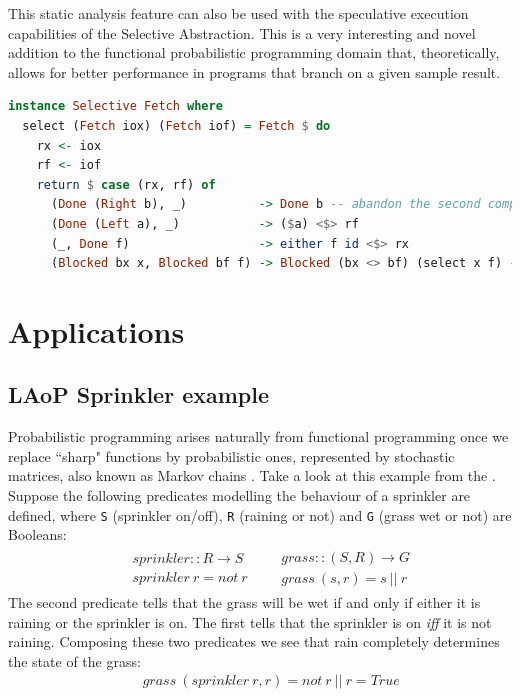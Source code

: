 \documentclass[
  oneside,
  11pt, a4paper,
  footinclude=true,
  headinclude=true,
  cleardoublepage=empty
]{scrbook}
\theoremstyle{definition}
\theoremstyle{definition}
\def\start{&&}
\def\more{\\&&}
\begin{document}
This static analysis feature can also be used with the speculative execution capabilities of the Selective Abstraction. This is a very interesting and novel addition to the functional probabilistic programming domain that, theoretically, allows for better performance in programs that branch on a given sample result.

    \begin{lstlisting}[language=Haskell, caption={Fetch Selective instance},captionpos=b]
instance Selective Fetch where
  select (Fetch iox) (Fetch iof) = Fetch $ do
    rx <- iox
    rf <- iof
    return $ case (rx, rf) of
      (Done (Right b), _)          -> Done b -- abandon the second computation
      (Done (Left a), _)           -> ($a) <$> rf
      (_, Done f)                  -> either f id <$> rx
      (Blocked bx x, Blocked bf f) -> Blocked (bx <> bf) (select x f) -- speculative execution
    \end{lstlisting}
    
    \chapter{Applications}\label{ch-applications}
    
        \section{LAoP Sprinkler example}
        
        Probabilistic programming arises naturally from functional programming once we replace ``sharp" functions by probabilistic ones, represented by stochastic matrices, also known as Markov chains \cite{oliveira2012towards}. Take a look at this example from the \citet{wiki:BayesianNetwork}. Suppose the following predicates modelling the behaviour of a sprinkler are defined, where \texttt{S} (sprinkler on/off), \texttt{R} (raining or not) and \texttt{G} (grass wet or not) are Booleans:
        \begin{eqnarray*}
        \begin{array}{rcl}
        \start sprinkler :: R \to S
        \more sprinkler\ r = not\ r
        \end{array}
        \begin{array}{rcl}
        \start grass :: (S, R) \to G
        \more grass\ (s,r) = s\ ||\ r
        \end{array}
        \end{eqnarray*}
        The second predicate tells that the grass will be wet if and only if either it is raining or the sprinkler is on. The first tells that the sprinkler is on \emph{iff} it is not raining. Composing these two predicates we see that rain completely determines the state of the grass:
        \begin{eqnarray*}
        \start grass\ (sprinkler\ r,r) = not\ r\ ||\ r = True
        \end{eqnarray*}
        
\end{document}
